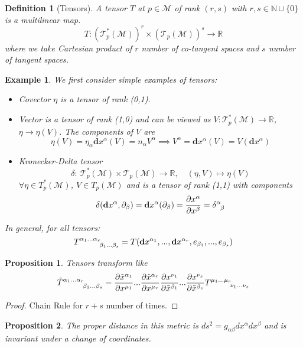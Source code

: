 \documentclass[a4paper]{article}
\newtheorem{eg}{Example}[section]
\theoremstyle{new}
\newtheorem{defi}{Definition}[section]
\newtheorem{prop}{Proposition}[section]
\begin{document}
\begin{defi}[Tensors]
A tensor $T$ at $p\in\mathcal{M}$ of rank $(r,s)$ with $r,s\in\mathbb{N}\cup\{0\}$ is a multilinear map.
$$T:(\mathcal{T}_p^*(\mathcal{M}))^r\times(\mathcal{T}_p(\mathcal{M}))^s\rightarrow\mathbb{R}$$
where we take Cartesian product of $r$ number of co-tangent spaces and $s$ number of tangent spaces.
\end{defi}
\begin{eg}
We first consider simple examples of tensors:
\begin{itemize}
    \item Covector $\eta$ is a tensor of rank (0,1). 
    \item Vector is a tensor of rank (1,0) and can be viewed as $V:\mathcal{T}_p^*(\mathcal{M})\rightarrow\mathbb{R}$, $\eta\rightarrow\eta(V)$. The components of $V$ are
    $$\eta(V)=\eta_\alpha\mathbf{d}x^\alpha(V)=n_\alpha V^\alpha\implies V^\alpha=\mathbf{d}x^\alpha(V)=V(\mathbf{d}x^\alpha)$$
    \item Kronecker-Delta tensor
    $$\delta:~\mathcal{T}_p^*(\mathcal{M})\times \mathcal{T}_p(\mathcal{M})\rightarrow\mathbb{R},\quad(\eta,V)\mapsto\eta(V)$$
    $\forall\eta\in T_p^*(\mathcal{M})$, $V\in T_p(\mathcal{M})$ and is a tensor of rank (1,1) with components $$\delta(\mathbf{d}x^\alpha,\partial_\beta)=\mathbf{d}x^\alpha(\partial_\beta)=\frac{\partial x^\alpha}{\partial x^\beta}=\tensor*{\delta}{*_{}^{\alpha}_{\beta}}$$
\end{itemize}
In general, for all tensors:
$$\tensor*{T}{*_{}^{\alpha_1...\alpha_r}_{\beta_1...\beta_s}}=T(\mathbf{d}x^{\alpha_1},...,\mathbf{d}x^{\alpha_r},e_{\beta_1},...,e_{\beta_s})$$
\end{eg}
\begin{prop}
Tensors transform like
$$\tensor*{\tilde{T}}{*_{}^{\alpha_1...\alpha_r}_{\beta_1...\beta_s}}=\frac{\partial\tilde{x}^{\alpha_1}}{\partial x^{\mu_1}}...\frac{\partial\tilde{x}^{\alpha_r}}{\partial x^{\mu_r}}\frac{\partial x^{\nu_1}}{\partial\tilde{x}^{\beta_1}}...\frac{\partial x^{\nu_s}}{\partial\tilde{x}^{\beta_s}}\tensor*{T}{*_{}^{\mu_1...\mu_r}_{\nu_1...\nu_s}}$$
\end{prop}
\begin{proof}
Chain Rule for $r+s$ number of times.
\end{proof}
\begin{prop}
The proper distance in this metric is $ds^2=g_{\alpha\beta}dx^\alpha dx^\beta$ and is invariant under a change of coordinates.
\end{prop}
\end{document}
